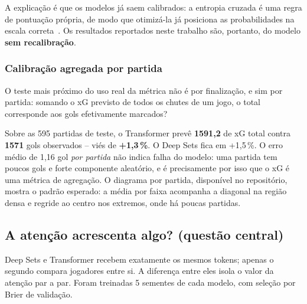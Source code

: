 \documentclass[12pt]{article}
\begin{document}
A explicação é que os modelos já saem calibrados: a entropia cruzada é uma regra
de pontuação própria, de modo que otimizá-la já posiciona as probabilidades na
escala correta~\cite{niculescu2005}. Os resultados reportados neste trabalho são,
portanto, do modelo \textbf{sem recalibração}.

\subsubsection*{Calibração agregada por partida}

O teste mais próximo do uso real da métrica não é por finalização, e sim por
partida: somando o xG previsto de todos os chutes de um jogo, o total corresponde
aos gols efetivamente marcados?

Sobre as 595 partidas de teste, o Transformer prevê \textbf{1591,2} de xG total
contra \textbf{1571} gols observados -- viés de \textbf{+1,3\,\%}. O Deep Sets
fica em +1,5\,\%. O erro médio de 1,16 gol \emph{por partida} não indica falha do
modelo: uma partida tem poucos gols e forte componente aleatório, e é
precisamente por isso que o xG é uma métrica de agregação. O diagrama por
partida, disponível no repositório, mostra o padrão esperado: a média por faixa
acompanha a diagonal na região densa e regride ao centro nos extremos, onde há
poucas partidas.

\subsection{A atenção acrescenta algo? (questão central)}

Deep Sets e Transformer recebem exatamente os mesmos tokens; apenas o segundo
compara jogadores entre si. A diferença entre eles isola o valor da atenção par a
par. Foram treinadas 5 sementes de cada modelo, com seleção por Brier de
validação.
\end{document}
